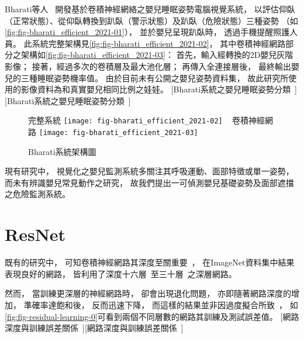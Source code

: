 \documentclass[class=NCU_thesis, crop=false]{standalone}
\begin{document}
Bharati等人~\cite{bharati_efficient_2021}
開發基於卷積神經網絡之嬰兒睡眠姿勢電腦視覺系統，
以評估仰臥（正常狀態）、從仰臥轉換到趴臥（警示狀態）及趴臥（危險狀態）三種姿勢
（如\cref{fig:fig-bharati_efficient_2021-01}），
並於嬰兒呈現趴臥時，
透過手機提醒照護人員。
此系統完整架構見\cref{fig:fig-bharati_efficient_2021-02}，
其中卷積神經網路部分之架構如\cref{fig:fig-bharati_efficient_2021-03}：
首先，輸入經轉換的2D嬰兒灰階影像；
接著，經過多次的卷積層及最大池化層；
再傳入全連接層後，
最終輸出嬰兒的三種睡眠姿勢機率值。
由於目前未有公開之嬰兒姿勢資料集，
故此研究所使用的影像資料為和真實嬰兒相同比例之娃娃。
[Bharati系統之嬰兒睡眠姿勢分類~\cite{bharati_efficient_2021}][Bharati系統之嬰兒睡眠姿勢分類~\cite{bharati_efficient_2021}]
\begin{figure}[!hbt]
    \centering
    \subcaptionbox
        {完整系統
        \label{fig:fig-bharati_efficient_2021-02}}
        {\texttt{[image: fig-bharati\_efficient\_2021-02]}}
    ~
    \subcaptionbox
        {卷積神經網路
        \label{fig:fig-bharati_efficient_2021-03}}
        {\texttt{[image: fig-bharati\_efficient\_2021-03]}}
    \caption{Bharati系統架構圖~\cite{bharati_efficient_2021}}
    \label{fig:fig-bharati_efficient_2021}
\end{figure}

現有研究中，
視覺化之嬰兒監測系統多關注其呼吸運動、面部特徵或單一姿勢，
而未有辨識嬰兒常見動作之研究，
故我們提出一可偵測嬰兒基礎姿勢及面部遮擋之危險監測系統。

\section{ResNet}
既有的研究中，
可知卷積神經網路其深度至關重要~\cite{simonyan_very_2015, szegedy_going_2015}，
在ImageNet資料集中結果表現良好的網路，
皆利用了深度十六層~\cite{simonyan_very_2015}至三十層~\cite{ioffe_batch_2015}之深層網路。

然而，
當訓練更深層的神經網路時，
卻會出現退化問題，
亦即隨著網路深度的增加，
準確率達飽和後，
反而迅速下降，
而這樣的結果並非因過度擬合所致~\cite{he_convolutional_2015, srivastava_highway_2015}，
如\cref{fig:fig-residual-learning-0}可看到兩個不同層數的網路其訓練及測試誤差值。
[網路深度與訓練誤差關係~\cite{he_deep_2016}][網路深度與訓練誤差關係~\cite{he_deep_2016}]
\end{document}
